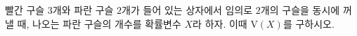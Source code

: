빨간 구슬 $3$개와 파란 구슬 $2$개가 들어 있는 상자에서 임의로 $2$개의 구슬을 동시에 꺼낼 때, 나오는 파란 구슬의 개수를 확률변수 $X$라 하자. 이때 $\mathrm{V}(X)$를 구하시오.
